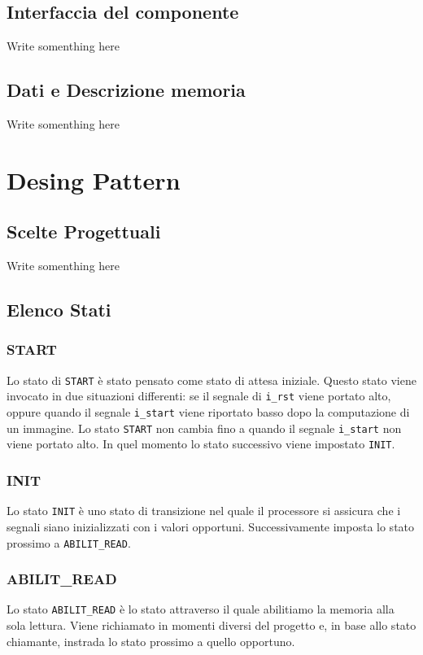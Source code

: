 \documentclass[11pt, a4paper]{article}
\begin{document}
\subsection{Interfaccia del componente}
Write somenthing here

\subsection{Dati e Descrizione memoria}
Write somenthing here

\section{Desing Pattern}
\subsection{Scelte Progettuali}
Write somenthing here

\subsection{Elenco Stati}

\subsubsection{START}
Lo stato di \texttt{START} è stato pensato come stato di attesa iniziale. Questo stato viene invocato in due situazioni differenti: se il segnale di \texttt{i\_rst} viene portato alto, oppure quando il segnale \texttt{i\_start} viene riportato basso dopo la computazione di un immagine. Lo stato \texttt{START} non cambia fino a quando il segnale \texttt{i\_start} non viene portato alto. In quel momento lo stato successivo viene impostato \texttt{INIT}.

\subsubsection{INIT}
Lo stato \texttt{INIT} è uno stato di transizione nel quale il processore si assicura che i segnali siano inizializzati con i valori opportuni. Successivamente imposta lo stato prossimo a \texttt{ABILIT\_READ}.

\subsubsection{ABILIT\_READ}
Lo stato \texttt{ABILIT\_READ} è lo stato attraverso il quale abilitiamo la memoria alla sola lettura. Viene richiamato in momenti diversi del progetto e, in base allo stato chiamante, instrada lo stato prossimo a quello opportuno.
\end{document}

